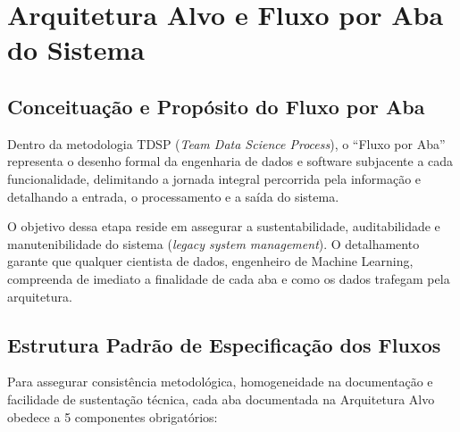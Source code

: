 \section{Arquitetura Alvo e Fluxo por Aba do Sistema}
\label{sec:arquitetura_alvo}

\subsection{Conceituação e Propósito do Fluxo por Aba}

Dentro da metodologia TDSP (\textit{Team Data Science Process}), o ``Fluxo por Aba'' representa o desenho formal da engenharia de dados e software subjacente a cada funcionalidade, delimitando a jornada integral percorrida pela informação e detalhando a entrada, o processamento e a saída do sistema.

O objetivo dessa etapa reside em assegurar a sustentabilidade, auditabilidade e manutenibilidade do sistema (\textit{legacy system management}). O detalhamento garante que qualquer cientista de dados, engenheiro de Machine Learning, compreenda de imediato a finalidade de cada aba e como os dados trafegam pela arquitetura.

\subsection{Estrutura Padrão de Especificação dos Fluxos}

Para assegurar consistência metodológica, homogeneidade na documentação e facilidade de sustentação técnica, cada aba documentada na Arquitetura Alvo obedece a 5 componentes obrigatórios:

